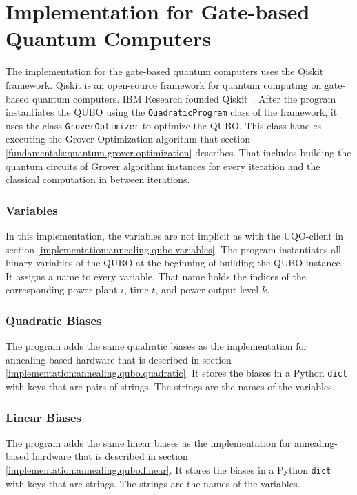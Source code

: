 \section{Implementation for Gate-based Quantum Computers}
\label{implement:gate.qubo}

The implementation for the gate-based quantum computers uses the Qiskit framework.
Qiskit is an open-source framework for quantum computing on gate-based quantum computers.
IBM Research founded Qiskit~\cite{QiskitWeb, QiskitGitHub}.
After the program instantiates the QUBO using the \texttt{QuadraticProgram} class of the framework, it uses the class \texttt{GroverOptimizer} to optimize the QUBO.
This class handles executing the Grover Optimization algorithm that section \ref{fundamentals:quantum.grover.optimization} describes.
That includes building the quantum circuits of Grover algorithm instances for every iteration and the classical computation in between iterations.

\subsubsection{Variables}

In this implementation, the variables are not implicit as with the UQO-client in section \ref{implementation:annealing.qubo.variables}.
The program instantiates all binary variables of the QUBO at the beginning of building the QUBO instance.
It assigns a name to every variable.
That name holds the indices of the corresponding power plant $i$, time $t$, and power output level $k$.

\subsubsection{Quadratic Biases}

The program adds the same quadratic biases as the implementation for annealing-based hardware that is described in section \ref{implementation:annealing.qubo.quadratic}.
It stores the biases in a Python \texttt{dict} with keys that are pairs of strings.
The strings are the names of the variables.

\subsubsection{Linear Biases}

The program adds the same linear biases as the implementation for annealing-based hardware that is described in section \ref{implementation:annealing.qubo.linear}.
It stores the biases in a Python \texttt{dict} with keys that are strings.
The strings are the names of the variables.

